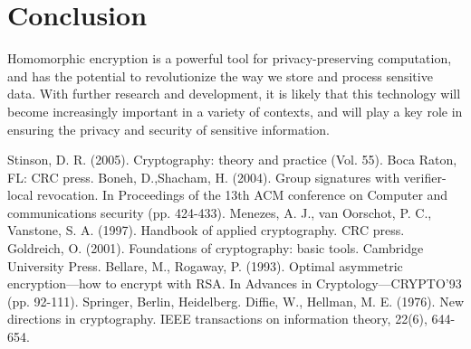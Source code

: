 \documentclass[conference]{IEEEtran}
\begin{document}
\section{Conclusion}
Homomorphic encryption is a powerful tool for privacy-preserving computation, and has the potential to revolutionize the way we store and process sensitive data. With further research and development, it is likely that this technology will become increasingly important in a variety of contexts, and will play a key role in ensuring the privacy and security of sensitive information.

\begin{thebibliography}{00}
 Stinson, D. R. (2005). Cryptography: theory and practice (Vol. 55). Boca Raton, FL: CRC press.
 Boneh, D.,Shacham, H. (2004). Group signatures with verifier-local revocation. In Proceedings of the 13th ACM conference on Computer and communications security (pp. 424-433).
 Menezes, A. J., van Oorschot, P. C.,  Vanstone, S. A. (1997). Handbook of applied cryptography. CRC press.
 Goldreich, O. (2001). Foundations of cryptography: basic tools. Cambridge University Press.
 Bellare, M., Rogaway, P. (1993). Optimal asymmetric encryption—how to encrypt with RSA. In Advances in Cryptology—CRYPTO'93 (pp. 92-111). Springer, Berlin, Heidelberg.
 Diffie, W.,  Hellman, M. E. (1976). New directions in cryptography. IEEE transactions on information theory, 22(6), 644-654.
\end{thebibliography}
\vspace{12pt}
\end{document}
